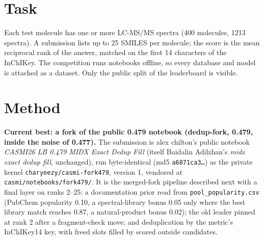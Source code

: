 \documentclass[11pt]{article}
\begin{document}
\begin{abstract}
test molecules on top of it scored the same 0.477 and was discarded. A ninth, alex chilton's public 0.479 notebook,
which adds a documentation prior and InChIKey14 deduplication on ranks 2--25, scored 0.479: our highest public score,
but $+0.002$ is inside the run-to-run noise, so it is kept as the base, not counted as a gain. Two offline probes, a
newer MIST encoder and an external spectral library, were closed without a submission. Blending the public neural scorer with
three seed retrains of it scored 0.463, and the public Gold Apex V22 timsTOF mass prior added alone scored 0.479 (no
change); both were discarded. A tenth fork, Hongbin Gu's public 0.487 notebook (Gold Apex V22 with a two-scorer
neural ensemble and 324{,}884 external library spectra for rank-1 promotion), reproduced 0.487: the new base, though
$+0.008$ over 0.479 is inside the $\pm0.016$ between submissions. A learned isomer reranker on top of it scored 0.487 at weights 0.20 and 0.15. An eleventh, alex chilton's public
0.492 notebook, adds a test-set molecular-network rerank (network weight 0.35) to the 0.487 pipeline and reproduced 0.492:
the new base and final pick A, though $+0.005$ is about one molecule and inside the noise. Heliosli's public notebook ran
cleanly but could not be submitted, because its datasets are not versioned. MIST \texttt{msg\_aug} on its ranks 2--25
scored 0.486 (not kept), and so did DreaMS in the same slot. 38 submissions were made and all were
scored. No calibrated local estimate of the score exists.
\end{abstract}

\section{Task}
Each test molecule has one or more LC-MS/MS spectra (400 molecules, 1213 spectra). A submission
lists up to 25 SMILES per molecule; the score is the mean reciprocal rank of the answer, matched on
the first 14 characters of the InChIKey. The competition runs notebooks offline, so every database
and model is attached as a dataset. Only the public split of the leaderboard is visible.

\section{Method}
\textbf{Current best: a fork of the public 0.479 notebook (dedup-fork, 0.479, inside the noise of 0.477).} The
submission is alex chilton's public notebook \emph{CASMI26 LB 0.479 \textbar{} MIDX Exact Dedup Fill} (itself
Baidalin Adilzhan's \emph{midx exact dedup fill}, unchanged), run byte-identical (md5 \texttt{a6871ca3\ldots}) as the
private kernel \nolinkurl{charyeezy/casmi-fork479}, version 1, vendored at \nolinkurl{casmi/notebooks/fork479/}. It
is the merged-fork pipeline described next with a final layer on ranks 2--25: a documentation prior read from
\texttt{pool\_popularity.csv} (PubChem popularity 0.10, a spectral-library bonus 0.05 only where the best library
match reaches 0.87, a natural-product bonus 0.02); the old leader pinned at rank 2 after a fragment-check move; and
deduplication by the metric's InChIKey14 key, with freed slots filled by scored outside candidates.
\end{document}
